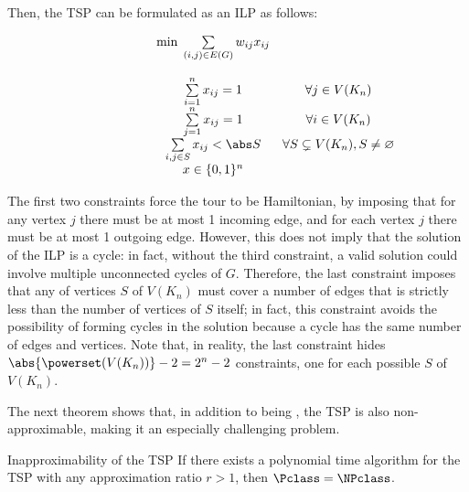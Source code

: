 \documentclass[a4paper, 12pt]{report}
\begin{document}
    Then, the TSP can be formulated as an ILP as follows:

    \[\begin{array}{ccc}
        \qquad\qquad\quad
        & \min \; \sum\limits_{(i, j) \in E(G)} {w_{ij}x_{ij}} \\\\
        & \sum\limits_{i = 1}^n {x_{ij}} = 1 & \forall j \in V(K_n) \\
        & \sum\limits_{j = 1}^n {x_{ij}} = 1 & \forall i \in V(K_n) \\
        & \sum\limits_{i, j \in S} {x_{ij}} < \abs S & \forall S \subsetneq V(K_n), S \neq \varnothing \\
        & x \in \{0,1\}^n
    \end{array}\]

    The first two constraints force the tour to be Hamiltonian, by imposing that for any vertex $j$ there must be at most 1 incoming edge, and for each vertex $j$ there must be at most 1 outgoing edge. However, this does not imply that the solution of the ILP is a cycle: in fact, without the third constraint, a valid solution could involve multiple unconnected cycles of $G$. Therefore, the last constraint imposes that any  of vertices $S$ of $V(K_n)$ must cover a number of edges that is strictly less than the number of vertices of $S$ itself; in fact, this constraint avoids the possibility of forming cycles in the solution because a cycle has the same number of edges and vertices. Note that, in reality, the last constraint hides $\abs{\powerset(V(K_n))} - 2 = 2^n - 2$ constraints, one for each possible  $S$ of $V(K_n)$.

    The next theorem shows that, in addition to being \NPComplete, the TSP is also non-approximable, making it an especially challenging problem.

    \begin{framedthm}{Inapproximability of the TSP}
        If there exists a polynomial time algorithm for the TSP with any approximation ratio $r > 1$, then $\Pclass = \NPclass$.
    \end{framedthm}
\end{document}
